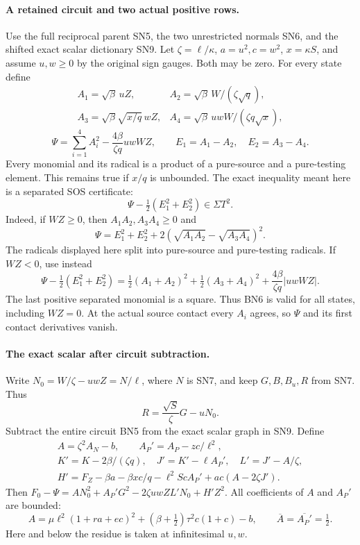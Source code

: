 \paragraph{A retained circuit and two actual positive rows.}
Use the full reciprocal parent SN5, the two unrestricted normals SN6,
and the shifted exact scalar dictionary SN9. Let $\zeta=\ell/\kappa$,
$a=u^2,c=w^2$, $x=\kappa S$, and assume $u,w\ge0$ by the original
sign gauges. Both may be zero. For every state define
\[
\begin{array}{ll}
 A_1=\sqrt\beta\,uZ,&A_2=\sqrt\beta\,W/(\zeta\sqrt q),\\
 A_3=\sqrt\beta\sqrt{x/q}\,wZ,
 &A_4=\sqrt\beta\,uwW/(\zeta q\sqrt x),
\end{array}\tag{BN4}
\]
\[
 \Psi=\sum_{i=1}^4 A_i^2-\frac{4\beta}{\zeta q}uwWZ,
 \qquad E_1=A_1-A_2,\quad E_2=A_3-A_4.
 \tag{BN5}
\]
Every monomial and its radical is a product of a pure-source and a
pure-testing element. This remains true if $x/q$ is unbounded.
The exact inequality meant here is a separated SOS certificate:
\[
                    \Psi-\tfrac12(E_1^2+E_2^2)\in\Sigma T^2.
 \tag{BN6}
\]
Indeed, if $WZ\ge0$, then $A_1A_2,A_3A_4\ge0$ and
\[
 \Psi=E_1^2+E_2^2+
              2(\sqrt{A_1A_2}-\sqrt{A_3A_4})^2.
\]
The radicals displayed here split into pure-source and pure-testing
radicals. If $WZ<0$, use instead
\[
 \Psi-\tfrac12(E_1^2+E_2^2)
 =\tfrac12(A_1+A_2)^2+\tfrac12(A_3+A_4)^2
                  +\frac{4\beta}{\zeta q}|uwWZ|.
\]
The last positive separated monomial is a square. Thus BN6 is valid
for all states, including $WZ=0$. At the actual source contact every
$A_i$ agrees, so $\Psi$ and its first contact derivatives vanish.

\paragraph{The exact scalar after circuit subtraction.}
Write $N_0=W/\zeta-uwZ=N/\ell$, where $N$ is SN7, and keep
$G,B,B_u,R$ from SN7. Thus
\[
 R=\frac{\sqrt S}{\zeta}G-uN_0.
 \tag{BN7}
\]
Subtract the entire circuit BN5 from the exact scalar graph in SN9.
Define
\[
\begin{gathered}
 A=\zeta^2 A_N-b,\qquad A_P'=A_P-zc/\ell^2,\\
 K'=K-2\beta/(\zeta q),\quad J'=K'-\ell A_P',
 \quad L'=J'-A/\zeta,\\
 H'=F_Z-\beta a-\beta xc/q-\ell^2ScA_P'
                          +ac(A-2\zeta J').
\end{gathered}\tag{BN8}
\]
Then $F_0-\Psi=A N_0^2+A_P'G^2-2\zeta uwZL'N_0+H'Z^2$.
All coefficients of $A$ and $A_P'$ are bounded:
\[
 A=\mu\ell^2(1+ra+ec)^2
       +(\beta+\tfrac12)\tau^2c(1+c)-b,
 \qquad \overline A=\overline{A_P'}=\tfrac12.
 \tag{BN9}
\]
Here and below the residue is taken at infinitesimal $u,w$.


